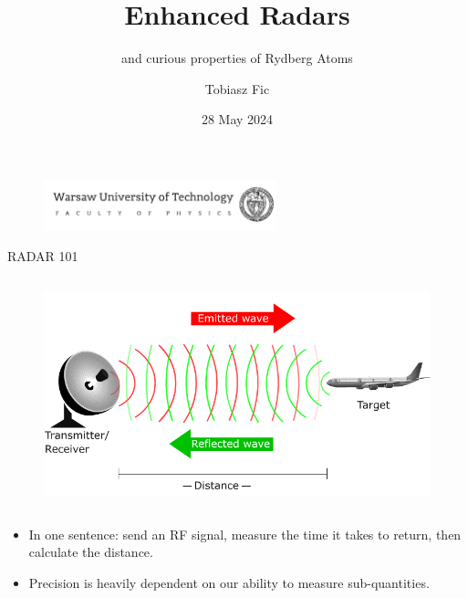 

\title{Enhanced Radars}
    \subtitle{and curious properties of Rydberg Atoms}
\author{Tobiasz Fic}
\date{28 May 2024}



\begin{frame}
    \maketitle
    \begin{figure}
        \centering
        \includegraphics[width=0.6\textwidth]{images/logo_eng.png}
    \end{figure}
\end{frame}

\begin{columnframe}{RADAR 101}
    \begin{column}{0.5\textwidth}
        \begin{figure}
            \centering
            \includegraphics[width=\textwidth]{images/radar_demo.png}
        \end{figure}
    \end{column}
    \begin{column}{0.5\textwidth}
        \begin{itemize}
            \item In one sentence: send an RF signal, measure the time it takes to return, then calculate the distance.
            \item Precision is heavily dependent on our ability to measure sub-quantities.
        \end{itemize}
    \end{column}
\end{columnframe}

